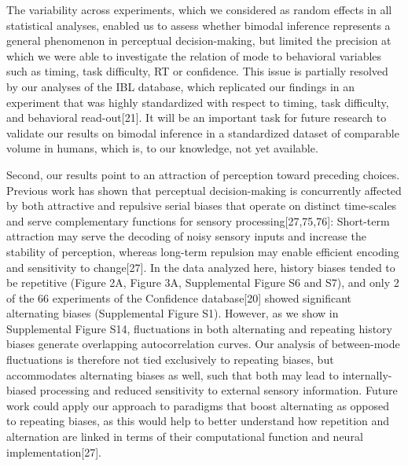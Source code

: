 \documentclass[
]{article}
\begin{document}
The variability across experiments, which we considered as random
effects in all statistical analyses, enabled us to assess whether
bimodal inference represents a general phenomenon in perceptual
decision-making, but limited the precision at which we were able to
investigate the relation of mode to behavioral variables such as timing,
task difficulty, RT or confidence. This issue is partially resolved by
our analyses of the IBL database, which replicated our findings in an
experiment that was highly standardized with respect to timing, task
difficulty, and behavioral read-out{[}21{]}. It will be an important
task for future research to validate our results on bimodal inference in
a standardized dataset of comparable volume in humans, which is, to our
knowledge, not yet available.

Second, our results point to an attraction of perception toward
preceding choices. Previous work has shown that perceptual
decision-making is concurrently affected by both attractive and
repulsive serial biases that operate on distinct time-scales and serve
complementary functions for sensory processing{[}27,75,76{]}: Short-term
attraction may serve the decoding of noisy sensory inputs and increase
the stability of perception, whereas long-term repulsion may enable
efficient encoding and sensitivity to change{[}27{]}. In the data
analyzed here, history biases tended to be repetitive (Figure 2A, Figure
3A, Supplemental Figure S6 and S7), and only 2 of the 66 experiments of
the Confidence database{[}20{]} showed significant alternating biases
(Supplemental Figure S1). However, as we show in Supplemental Figure
S14, fluctuations in both alternating and repeating history biases
generate overlapping autocorrelation curves. Our analysis of
between-mode fluctuations is therefore not tied exclusively to repeating
biases, but accommodates alternating biases as well, such that both may
lead to internally-biased processing and reduced sensitivity to external
sensory information. Future work could apply our approach to paradigms
that boost alternating as opposed to repeating biases, as this would
help to better understand how repetition and alternation are linked in
terms of their computational function and neural implementation{[}27{]}.
\end{document}
